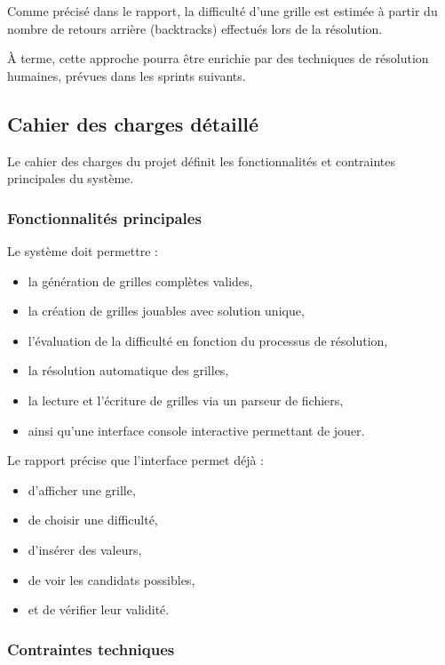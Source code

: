 \documentclass[a4paper]{article}
\begin{document}
Comme précisé dans le rapport, la difficulté d’une grille est estimée à partir du nombre de retours arrière (backtracks) effectués lors de la résolution.

À terme, cette approche pourra être enrichie par des techniques de résolution humaines, prévues dans les sprints suivants.

\subsection{Cahier des charges détaillé}

Le cahier des charges du projet définit les fonctionnalités et contraintes principales du système.

\subsubsection{Fonctionnalités principales}

Le système doit permettre :
\begin{itemize}
    \item la génération de grilles complètes valides,
    \item la création de grilles jouables avec solution unique,
    \item l’évaluation de la difficulté en fonction du processus de résolution,
    \item la résolution automatique des grilles,
    \item la lecture et l’écriture de grilles via un parseur de fichiers,
    \item ainsi qu’une interface console interactive permettant de jouer.
\end{itemize}

Le rapport précise que l’interface permet déjà :
\begin{itemize}
    \item d’afficher une grille,
    \item de choisir une difficulté,
    \item d’insérer des valeurs,
    \item de voir les candidats possibles,
    \item et de vérifier leur validité.
\end{itemize}

\subsubsection{Contraintes techniques}
\end{document}
